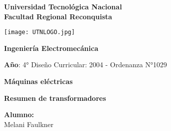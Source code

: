 \documentclass[11pt,a4paper,titlepage]{article}
\begin{document}
	\begin{titlepage}
		\begin{center}		
			{\huge \textbf{Universidad Tecnológica Nacional}}\\
			{\huge \textbf{Facultad Regional Reconquista}}
			
			\vspace{1cm}
			
			\texttt{[image: UTNLOGO.jpg]}\\
			
			\vspace{1cm}
			
			{\huge\textbf{Ingeniería Electromecánica}}
			
			\vspace{1cm}
			
			{\textbf{Año}: 4°} \hspace{5cm}  {Diseño Curricular: 2004 - Ordenanza N°1029 }
			
			\vspace{1cm}
			
			{{\LARGE  \textbf{Máquinas eléctricas}}}
			\vspace{1cm}
			
			{\LARGE \textbf{Resumen de transformadores}}
			
		\end{center}
		
		\begin{flushleft}
			\Large
			\textbf{Alumno:}\\
			\vspace{5mm}
			\hspace{3cm}Melani Faulkner
		\end{flushleft}
	\end{titlepage}

	
	
\end{document}
